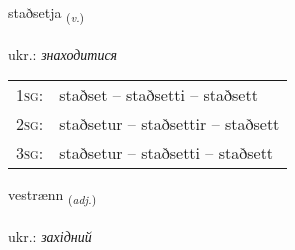 \documentclass[frontgrid, backgrid]{flacards}\usepackage[]{graphicx}\usepackage[]{xcolor}
\begin{document}
{staðsetja \small{\textsubscript{(\textit{v.})}} \\[1ex] %
\textphonetic{[staðsɛtja]} \\
ukr.: \emph{знаходитися} \\  [2ex]
\renewcommand*{\arraystretch}{0.8}
\begin{tabular}{p{1cm}l}
\textsc{1sg}: & staðset -- staðsetti -- staðsett \\ 
\textsc{2sg}: & staðsetur -- staðsettir -- staðsett \\ 
\textsc{3sg}: & staðsetur -- staðsetti -- staðsett \\ 
\end{tabular}
}

\renewcommand{\flhead}{\vskip5pt \fboxsep=0pt {\small\bfseries\footnotesize Lýsingarorð | прикметник}}
\renewcommand{\fcfoot}{\vskip5pt \fboxsep=0pt \hspace{2pt}{\small\bfseries\footnotesize 3K}}

\renewcommand{\blhead}{\vskip5pt {\small\bfseries\footnotesize Lýsingarorð | прикметник }}
\renewcommand{\bcfoot}{\vskip5pt \hspace{2pt}{\small\bfseries\footnotesize 3K}}


{vestrænn \small{\textsubscript{(\textit{adj.})}} \\[1ex] %
\textphonetic{[vɛstraitn̥]} \\
ukr.: \emph{західний} \\  [2ex]
\renewcommand*{\arraystretch}{0.8}
}

\renewcommand{\flhead}{\vskip5pt \fboxsep=0pt {\small\bfseries\footnotesize Nafnorð | іменник}}
\renewcommand{\fcfoot}{\vskip5pt \fboxsep=0pt \hspace{2pt}{\small\bfseries\footnotesize 3K}}
\end{document}

